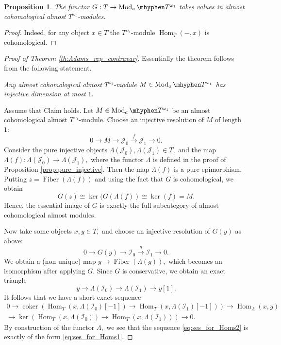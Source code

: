 \documentclass[11pt,leqno]{amsart}
\newtheorem{prop}[theo]{Proposition}
\numberwithin{equation}{section}
\def\Hom{\operatorname{Hom}}
\newcommand{\tens}[1]{%
  \mathbin{\mathop{\otimes}\displaylimits_{#1}}%
}
\newcommand{\hy}{\mhyphen}
\newcommand{\xto}{\xrightarrow}
\newcommand{\Fiber}{\operatorname{Fiber}}
\newcommand{\cJ}{{\mathcal J}}
\newcommand{\cI}{{\mathcal I}}
\newcommand{\coker}{\operatorname{coker}}
\newcommand{\Mod}{\operatorname{Mod}}
\begin{document}
\begin{prop}\label{prop:G_maps_to_cohom_modules} The functor $G:T\to \Mod_a\hy T^{\omega_1}$ takes values in almost cohomological almost $T^{\omega_1}$-modules.\end{prop}

\begin{proof}Indeed, for any object $x\in T$ the $T^{\omega_1}$-module $\Hom_T(-,x)$ is cohomological.
\end{proof}



\begin{proof}[Proof of Theorem \ref{th:Adams_rep_contravar}] Essentially the theorem follows from the following statement.

{} {\it Any almost cohomological almost $T^{\omega_1}$-module $M\in\Mod_a\hy T^{\omega_1}$ has injective dimension at most $1.$}

Assume that Claim holds. Let $M\in\Mod_a\hy T^{\omega_1}$ be an almost cohomological almost $T^{\omega_1}$-module. Choose an injective resolution of $M$ of length $1:$
$$0\to M\to \cJ_0\xto{f} \cJ_1\to 0.$$
Consider the pure injective objects $\Lambda(\cJ_0), \Lambda(\cJ_1)\in T,$ and the map $\Lambda(f):\Lambda(\cJ_0)\to \Lambda(\cJ_1),$ where the functor $\Lambda$ is defined in the proof of Proposition \ref{prop:pure_injective}. Then the map $\Lambda(f)$ is a pure epimorphism. Putting $z=\Fiber(\Lambda(f))$ and using the fact that $G$ is cohomological, we obtain
$$G(z)\cong\ker(G(\Lambda(f))\cong\ker(f)=M.$$
Hence, the essential image of $G$ is exactly the full subcategory of almost cohomological almost modules.

Now take some objects $x,y\in T,$ and choose an injective resolution of $G(y)$ as above: 
$$0\to G(y)\to \cI_0\xto{g} \cI_1\to 0.$$
We obtain a (non-unique) map $y\to \Fiber(\Lambda(g)),$ which becomes an isomorphism after applying $G.$ Since $G$ is conservative, we obtain an exact triangle
$$y\to \Lambda(\cI_0)\to \Lambda(\cI_1)\to y[1].$$
It follows that we have a short exact sequence
\begin{multline}\label{eq:ses_for_Homs2} 0\to \coker(\Hom_T(x,\Lambda(\cI_0)[-1])\to \Hom_T(x,\Lambda(\cI_1)[-1]))\to \Hom_\Lambda(x,y)\\
\to\ker(\Hom_T(x,\Lambda(\cI_0))\to \Hom_T(x,\Lambda(\cI_1)))\to 0.\end{multline}
By construction of the functor $\Lambda,$ we see that the sequence \eqref{eq:ses_for_Homs2} is exactly of the form \eqref{eq:ses_for_Homs1}.


\end{proof}
\end{document}
